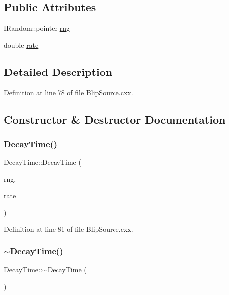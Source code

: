 \subsection*{Public Attributes}
\begin{DoxyCompactItemize}
\item 
I\+Random\+::pointer \hyperlink{struct_decay_time_a12b72a0c00ea60b09bb0fd03bea2b519}{rng}
\item 
double \hyperlink{struct_decay_time_a6fda8b08aa27b4ff40ada16d00c67363}{rate}
\end{DoxyCompactItemize}


\subsection{Detailed Description}


Definition at line 78 of file Blip\+Source.\+cxx.



\subsection{Constructor \& Destructor Documentation}
\mbox{\label{struct_decay_time_a4499a1e581978cdc034274139017e1cb}} 
\subsubsection{\texorpdfstring{Decay\+Time()}{DecayTime()}}
{\footnotesize\ttfamily Decay\+Time\+::\+Decay\+Time (\begin{DoxyParamCaption}\item[{I\+Random\+::pointer}]{rng,  }\item[{double}]{rate }\end{DoxyParamCaption})\hspace{0.3cm}{\ttfamily [inline]}}



Definition at line 81 of file Blip\+Source.\+cxx.

\mbox{\label{struct_decay_time_a4d665baf95f039de72a3a286d621d96a}} 
\subsubsection{\texorpdfstring{$\sim$\+Decay\+Time()}{~DecayTime()}}
{\footnotesize\ttfamily Decay\+Time\+::$\sim$\+Decay\+Time (\begin{DoxyParamCaption}{ }\end{DoxyParamCaption})\hspace{0.3cm}{\ttfamily [inline]}}



